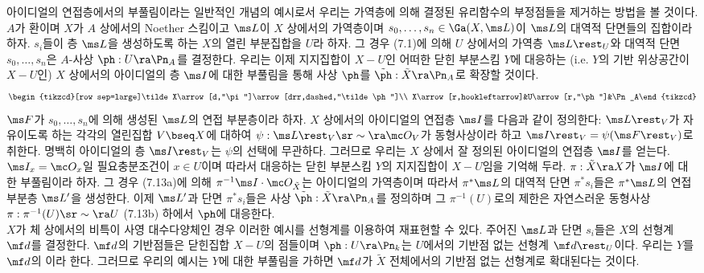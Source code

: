	
	\begin{example}
	아이디얼의 연접층에서의 부풀림이라는 일반적인 개념의 예시로서 우리는 가역층에 의해 결정된 유리함수의 부정점들을 제거하는 방법을 볼 것이다.
	$A$가 환이며 $X$가 $A$ 상에서의 Noether 스킴이고 $\ms L$이 $X$ 상에서의 가역층이며
	$s_0,\ldots,s_n\in\Ga(X,\ms L)$이 $\ms L$의 대역적 단면들의 집합이라 하자.
	$s_i$들이 층 $\ms L$을 생성하도록 하는 $X$의 열린 부분집합을 $U$라 하자.
	그 경우 (7.1)에 의해 $U$ 상에서의 가역층 $\ms L\rest_U$와 대역적 단면 $s_0,\ldots,s_n$은 $A$-사상 $\ph:U\ra\Pn_A$를 결정한다.
	우리는 이제 지지집합이 $X-U$인 어떠한 닫힌 부분스킴 $Y$에 대응하는 (i.e. $Y$의 기반 위상공간이 $X-U$인)
	$X$ 상에서의 아이디얼의 층 $\ms I$에 대한 부풀림을 통해 사상 $\ph$를 $\tilde\ph:\tilde X\ra\Pn_A$로 확장할 것이다.
	$$\begin{tikzcd}[row sep=large]\tilde X\arrow[d,"\pi"]\arrow[drr,dashed,"\tilde\ph"]\\
	X\arrow[r,hookleftarrow]&U\arrow[r,"\ph"]&\Pn_A\end{tikzcd}$$
	$\ms F$가 $s_0,\ldots,s_n$에 의해 생성된 $\ms L$의 연접 부분층이라 하자. $X$ 상에서의 아이디얼의 연접층 $\ms I$를 다음과 같이 정의한다:
	$\ms L\rest_V$가 자유이도록 하는 각각의 열린집합 $V\bseq X$에 대하여 $\psi:\ms L\rest_V\sr\sim\ra\mc O_V$가 동형사상이라 하고
	$\ms I\rest_V=\psi(\ms F\rest_V)$로 취한다. 명백히 아이디얼의 층 $\ms I\rest_V$는 $\psi$의 선택에 무관하다.
	그러므로 우리는 $X$ 상에서 잘 정의된 아이디얼의 연접층 $\ms I$를 얻는다.
	$\ms I_x=\mc O_x$일 필요충분조건이 $x\in U$이며 따라서 대응하는 닫힌 부분스킴 $Y$의 지지집합이 $X-U$임을 기억해 두라.
	$\pi:\tilde X\ra X$가 $\ms I$에 대한 부풀림이라 하자.
	그 경우 (7.13a)에 의해 $\pi^{-1}\ms I\cdot\mc O_{\tilde X}$는 아이디얼의 가역층이며
	따라서 $\pi^*\ms L$의 대역적 단면 $\pi^*s_i$들은 $\pi^*\ms L$의  연접 부분층 $\ms L'$을 생성한다.
	이제 $\ms L'$과 단면 $\pi^*s_i$들은 사상 $\tilde\ph:\tilde X\ra\Pn_A$를 정의하며
	그 $\pi^{-1}(U)$로의 제한은 자연스러운 동형사상 $\pi:\pi^{-1}(U)\sr\sim\ra U$ (7.13b) 하에서 $\ph$에 대응한다.\\
	$X$가 체 상에서의 비특이 사영 대수다양체인 경우 이러한 예시를 선형계를 이용하여 재표현할 수 있다.
	주어진 $\ms L$과 단면 $s_i$들은 $X$의 선형계 $\mf d$를 결정한다.
	$\mf d$의 기반점들은 닫힌집합 $X-U$의 점들이며 $\ph:U\ra\Pn_k$는 $U$에서의 기반점 없는 선형계 $\mf d\rest_U$이다.
	우리는 $Y$를 $\mf d$의 이라 한다.
	그러므로 우리의 예시는 $Y$에 대한 부풀림을 가하면 $\mf d$가 $\tilde X$ 전체에서의 기반점 없는 선형계로 확대된다는 것이다.
	\end{example}
	
